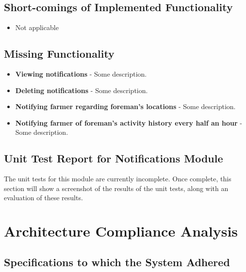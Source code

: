 \documentclass[11pt,fleqn]{book} %
\begin{document}
	\section{Short-comings of Implemented Functionality}
		\begin{itemize}
			\item{Not applicable}
		\end{itemize}
	\section{Missing Functionality}
		\begin{itemize}
			\item\textbf{Viewing notifications} -
			Some description.
			
			\item\textbf{Deleting notifications} -
			Some description.
			
			\item\textbf{Notifying farmer regarding foreman’s locations} -
			Some description.
			
			\item\textbf{Notifying farmer of foreman’s activity history every half an hour} -
			Some description.			
		\end{itemize}
	\section{Unit Test Report for Notifications Module}
		The unit tests for this module are currently incomplete. Once complete, this section will show a screenshot of the results of the unit tests, along with an evaluation of these results.
	
	


\chapter{Architecture Compliance Analysis}

	\section{Specifications to which the System Adhered}
\end{document}
